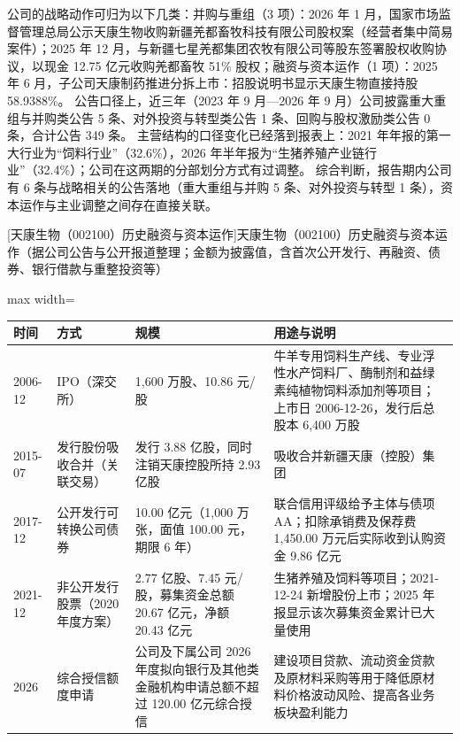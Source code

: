  公司的战略动作可归为以下几类：并购与重组（3 项）：2026 年 1 月，国家市场监督管理总局公示天康生物收购新疆羌都畜牧科技有限公司股权案（经营者集中简易案件）；2025 年 12 月，与新疆七星羌都集团农牧有限公司等股东签署股权收购协议，以现金 12.75 亿元收购羌都畜牧 51\% 股权；融资与资本运作（1 项）：2025 年 6 月，子公司天康制药推进分拆上市：招股说明书显示天康生物直接持股 58.9388\%。 公告口径上，近三年（2023 年 9 月---2026 年 9 月）公司披露重大重组与并购类公告 5 条、对外投资与转型类公告 1 条、回购与股权激励类公告 0 条，合计公告 349 条。 主营结构的口径变化已经落到报表上：2021 年年报的第一大行业为“饲料行业”（32.6\%），2026 年半年报为“生猪养殖产业链行业”（32.4\%）；公司在这两期的分部划分方式有过调整。 综合判断，报告期内公司有 6 条与战略相关的公告落地（重大重组与并购 5 条、对外投资与转型 1 条），资本运作与主业调整之间存在直接关联。

\begin{center}\small\setlength{\tabcolsep}{4pt}
[天康生物（002100）历史融资与资本运作]{天康生物（002100）历史融资与资本运作（据公司公告与公开报道整理；金额为披露值，含首次公开发行、再融资、债券、银行借款与重整投资等）}
\begin{adjustbox}{max width=\textwidth}
\begin{tabular}{@{}p{1.45cm}p{2.55cm}p{4.05cm}p{4.95cm}@{}}
\toprule
时间 & 方式 & 规模 & 用途与说明 \\
\midrule
2006-12 & IPO（深交所） & 1,\allowbreak{}600 万股、\allowbreak{}10.86 元/\allowbreak{}股 & 牛羊专用饲料生产线、\allowbreak{}专业浮性水产饲料厂、\allowbreak{}酶制剂和益绿素纯植物饲料添加剂等项目；上市日 2006-12-26，\allowbreak{}发行后总股本 6,\allowbreak{}400 万股 \\
2015-07 & 发行股份吸收合并（关联交易） & 发行 3.88 亿股，\allowbreak{}同时注销天康控股所持 2.93 亿股 & 吸收合并新疆天康（控股）集团 \\
2017-12 & 公开发行可转换公司债券 & 10.00 亿元（1,\allowbreak{}000 万张，\allowbreak{}面值 100.00 元，\allowbreak{}期限 6 年） & 联合信用评级给予主体与债项 AA；扣除承销费及保荐费 1,\allowbreak{}450.00 万元后实际收到认购资金 9.86 亿元 \\
2021-12 & 非公开发行股票（2020 年度方案） & 2.77 亿股、\allowbreak{}7.45 元/\allowbreak{}股，\allowbreak{}募集资金总额 20.67 亿元，\allowbreak{}净额 20.43 亿元 & 生猪养殖及饲料等项目；2021-12-24 新增股份上市；2025 年报显示该次募集资金累计已大量使用 \\
2026 & 综合授信额度申请 & 公司及下属公司 2026 年度拟向银行及其他类金融机构申请总额不超过 120.00 亿元综合授信 & 建设项目贷款、\allowbreak{}流动资金贷款及原材料采购等用于降低原材料价格波动风险、\allowbreak{}提高各业务板块盈利能力 \\
\bottomrule
\end{tabular}
\end{adjustbox}
\end{center}

